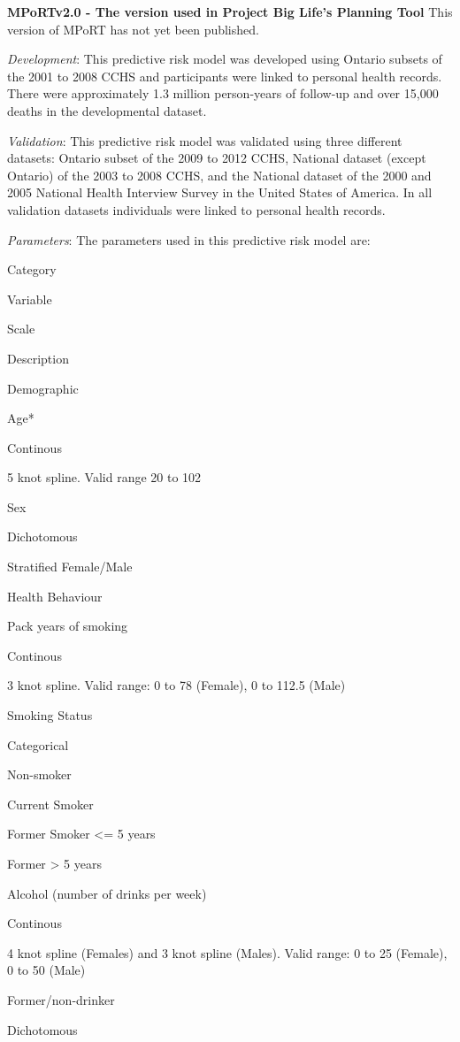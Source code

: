 \documentclass[]{book}
\begin{document}
\textbf{MPoRTv2.0 - The version used in Project Big Life's Planning
Tool} This version of MPoRT has not yet been published.

\emph{Development}: This predictive risk model was developed using
Ontario subsets of the 2001 to 2008 CCHS and participants were linked to
personal health records. There were approximately 1.3 million
person-years of follow-up and over 15,000 deaths in the developmental
dataset.

\emph{Validation}: This predictive risk model was validated using three
different datasets: Ontario subset of the 2009 to 2012 CCHS, National
dataset (except Ontario) of the 2003 to 2008 CCHS, and the National
dataset of the 2000 and 2005 National Health Interview Survey in the
United States of America. In all validation datasets individuals were
linked to personal health records.

\emph{Parameters}: The parameters used in this predictive risk model
are:

Category

Variable

Scale

Description

Demographic

Age*

Continous

5 knot spline. Valid range 20 to 102

Sex

Dichotomous

Stratified Female/Male

Health Behaviour

Pack years of smoking

Continous

3 knot spline. Valid range: 0 to 78 (Female), 0 to 112.5 (Male)

Smoking Status

Categorical

Non-smoker

Current Smoker

Former Smoker \textless{}= 5 years

Former \textgreater{} 5 years

Alcohol (number of drinks per week)

Continous

4 knot spline (Females) and 3 knot spline (Males). Valid range: 0 to 25
(Female), 0 to 50 (Male)

Former/non-drinker

Dichotomous
\end{document}
